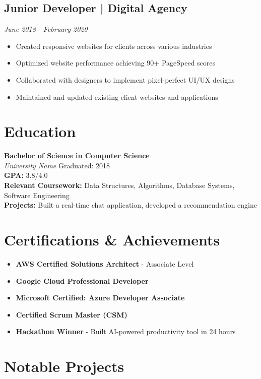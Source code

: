 \documentclass[11pt,a4paper]{article}
\begin{document}
\subsection{Junior Developer | Digital Agency}
\textit{June 2018 - February 2020}
\begin{itemize}
\item Created responsive websites for clients across various industries
\item Optimized website performance achieving 90+ PageSpeed scores
\item Collaborated with designers to implement pixel-perfect UI/UX designs
\item Maintained and updated existing client websites and applications
\end{itemize}

\section{Education}

\textbf{Bachelor of Science in Computer Science} \\
\textit{University Name} \hfill Graduated: 2018 \\
\textbf{GPA:} 3.8/4.0 \\
\textbf{Relevant Coursework:} Data Structures, Algorithms, Database Systems, Software Engineering \\
\textbf{Projects:} Built a real-time chat application, developed a recommendation engine

\section{Certifications \& Achievements}

\begin{itemize}
\item \textbf{AWS Certified Solutions Architect} - Associate Level
\item \textbf{Google Cloud Professional Developer}
\item \textbf{Microsoft Certified: Azure Developer Associate}
\item \textbf{Certified Scrum Master (CSM)}
\item \textbf{Hackathon Winner} - Built AI-powered productivity tool in 24 hours
\end{itemize}

\section{Notable Projects}
\end{document}
